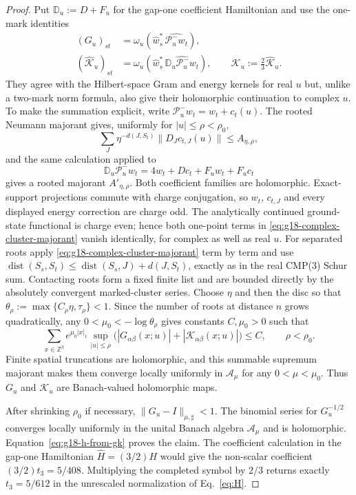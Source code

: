 \begin{proof}
Put $\mathbb D_u:=D+F_u$ for the gap-one coefficient Hamiltonian
and use the one-mark identities
\begin{align}
 (G_u)_{st}
 &=\omega_u\!\left(\widehat w_s^*\,\widehat{\mathcal P_u^-w_t}\right),
 \label{eq:g18-one-mark-g-analytic}\\
 (\widehat{\mathcal K}_u)_{st}
 &=\omega_u\!\left(\widehat w_s^*\,
       \widehat{\mathbb D_u\mathcal P_u^-w_t}\right),
 \qquad \mathcal K_u:=\frac23\widehat{\mathcal K}_u.
 \label{eq:g18-one-mark-k-analytic}
\end{align}
They agree with the Hilbert-space Gram and energy kernels for real $u$ but,
unlike a two-mark norm formula, also give their holomorphic continuation to
complex $u$.  To make the summation explicit, write
$\mathcal P_u^-w_t=w_t+c_t(u)$.  The rooted Neumann majorant gives, uniformly
for $|u|\le\rho<\rho_0$,
\[
 \sum_J\eta^{-d(J,S_t)}\|D_Jc_{t,J}(u)\|\le A_{\eta,\rho},
\]
and the same calculation applied to
\[
 \mathbb D_u\mathcal P_u^-w_t
 =4w_t+Dc_t+F_uw_t+F_uc_t
\]
gives a rooted majorant $A'_{\eta,\rho}$.  Both coefficient families are
holomorphic.  Exact-support projections commute with charge conjugation, so
$w_t$, $c_{t,J}$ and every displayed energy correction are charge odd.  The
analytically continued ground-state functional is charge even; hence both
one-point terms in
\eqref{eq:g18-complex-cluster-majorant} vanish identically, for complex as
well as real $u$.  For separated roots apply
\eqref{eq:g18-complex-cluster-majorant} term by term and use
$\operatorname{dist}(S_s,S_t)\le
\operatorname{dist}(S_s,J)+d(J,S_t)$, exactly as in the real CMP(3) Schur
sum.  Contacting roots form a fixed finite list and are bounded directly by
the absolutely convergent marked-cluster series.  Choose $\eta$ and then the
disc so that
$\theta_\rho:=\max\{C_\rho\eta,\tau_\rho\}<1$.  Since the number of roots at
distance $n$ grows quadratically, any
$0<\mu_0<-\log\theta_\rho$ gives constants $C,\mu_0>0$ such that
\[
 \sum_{x\in\mathbb Z^3}e^{\mu_0|x|_1}
 \sup_{|u|\le\rho}\bigl(
   |G_{\alpha\beta}(x;u)|
   +|\mathcal K_{\alpha\beta}(x;u)|
 \bigr)\le C,
 \qquad \rho<\rho_0.
\]
Finite spatial truncations are holomorphic, and this summable supremum
majorant makes them converge locally uniformly in $\mathcal A_\mu$ for any
$0<\mu<\mu_0$.  Thus $G_u$ and $\mathcal K_u$ are Banach-valued holomorphic
maps.

After shrinking $\rho_0$ if necessary,
$\|G_u-I\|_{\mu,\sharp}<1$.  The binomial series for $G_u^{-1/2}$ converges
locally uniformly in the unital Banach algebra $\mathcal A_\mu$ and is
holomorphic.  Equation~\eqref{eq:g18-h-from-gk} proves the claim.  The
coefficient calculation in the gap-one Hamiltonian
$\widehat H=(3/2)H$ would give the non-scalar coefficient
$(3/2)t_3=5/408$.  Multiplying the completed symbol by $2/3$ returns exactly
$t_3=5/612$ in the unrescaled normalization of Eq.~\eqref{eq:H}.
\end{proof}

